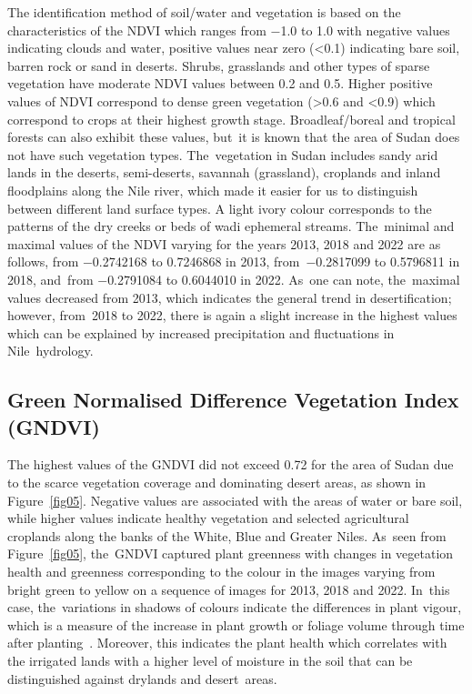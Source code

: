 \documentclass[jimaging,article,accept,pdftex,moreauthors]{Definitions/mdpi}
\begin{document}
The identification method of soil/water and vegetation is based on the characteristics of the NDVI which ranges from $-$1.0 to 1.0 with negative values indicating clouds and water, positive values near zero (<0.1) indicating  bare soil, barren rock or sand in deserts. Shrubs, grasslands and other types of sparse vegetation have moderate NDVI values between 0.2 and 0.5. Higher positive values of NDVI correspond to dense green vegetation (>0.6 and <0.9) which correspond to crops at their highest growth stage. Broadleaf/boreal and tropical forests can also exhibit these values, but~it is known that the area of Sudan does not have such vegetation types. The~vegetation in Sudan includes sandy arid lands in the deserts, semi-deserts, savannah (grassland), croplands and inland floodplains along the Nile river, which made it easier for us to distinguish between different land surface types. A light ivory colour corresponds to the patterns of the dry creeks or beds of wadi ephemeral streams. The~minimal and maximal values of the NDVI varying for the years 2013, 2018 and 2022 are as follows, from $-$0.2742168 to 0.7246868 in 2013, from~$-$0.2817099 to 0.5796811 in 2018, and~from $-$0.2791084 to 0.6044010 in 2022. As~one can note, the~maximal values decreased from 2013, which indicates the general trend in desertification; however, from~2018 to 2022, there is again a slight increase in the highest values which can be explained by increased precipitation and fluctuations in Nile~hydrology. 

\subsection{Green Normalised Difference Vegetation Index (GNDVI)}

The highest values of the GNDVI did not exceed 0.72 for the area of Sudan due to the scarce vegetation coverage and dominating desert areas, as shown in Figure~\ref{fig05}. Negative values are associated with the areas of water or bare soil, while higher values indicate healthy vegetation and selected agricultural croplands along the banks of the White, Blue and Greater Niles. As~seen from Figure~\ref{fig05}, the~GNDVI captured plant greenness with changes in vegetation health and greenness corresponding to the colour in the images varying from bright green to yellow on a sequence of images for 2013, 2018 and 2022. In~this case, the~variations in shadows of colours indicate the differences in plant vigour, which is a measure of the increase in plant growth or foliage volume through time after planting~\cite{Dictionary}. Moreover, this indicates the plant health which correlates with the irrigated lands with a higher level of moisture in the soil that can be distinguished against drylands and desert~areas. 
\end{document}
